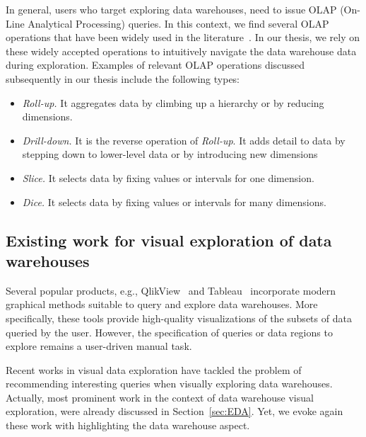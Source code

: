 In general, users who target exploring data warehouses, need to issue OLAP (On-Line Analytical Processing)  queries.
In this context, we find several OLAP operations that have been widely used in the literature~\cite{Vassiliadis:99}. In our thesis, we rely on these widely accepted operations %
to intuitively navigate the data warehouse data during exploration.
Examples of relevant OLAP operations discussed subsequently in our thesis include the following types:
\begin{itemize}
\item \emph{Roll-up.} It aggregates data by climbing up a hierarchy or by reducing dimensions. %
\item \emph{Drill-down.}  It is the reverse operation of \emph{Roll-up}. It adds detail to data by stepping down to lower-level data or by introducing new dimensions
\item \emph{Slice.} It selects data by fixing values or intervals for one dimension.
\item \emph{Dice.} It selects data by fixing values or intervals for many dimensions.
\end{itemize}

{\color{Fuchsia}}





\subsection{Existing work for visual exploration of data warehouses} 
Several popular products, e.g., QlikView~\cite{url:QlikView} and Tableau~\cite{url:tableau} incorporate modern graphical methods suitable to query and explore data warehouses.  
More specifically, these tools provide high-quality visualizations of the subsets of data queried by the user.
However, the specification of queries or data regions to explore remains a user-driven manual task. 


Recent works in visual data exploration have tackled the problem of recommending interesting queries when visually exploring data warehouses. 
 Actually, most prominent work in the context of data warehouse visual exploration, were already discussed in Section~\ref{sec:EDA}. Yet, we evoke again these work with highlighting the data warehouse aspect. 

